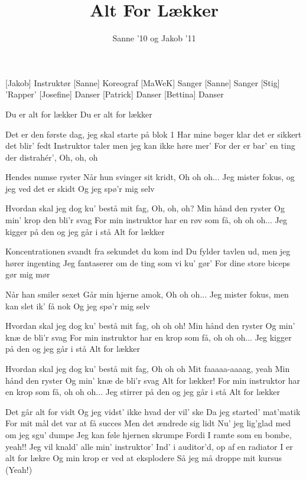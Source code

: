 \documentclass[a4paper,11pt]{article}
\title{Alt For Lækker}
\author{Sanne '10 og Jakob '11}
\begin{document}
\maketitle

\begin{roles}
[Jakob] Instruktør
[Sanne] Koreograf
[MaWeK] Sanger
[Sanne] Sanger 
[Stig] 'Rapper' 
[Josefine] Danser 
[Patrick] Danser 
[Bettina] Danser 
\end{roles}

\begin{song}
 Du er alt for lækker
Du er alt for lækker


 Det er den første dag, jeg skal starte på blok 1
Har mine bøger klar det er sikkert det blir' fedt
Instruktor taler men jeg kan ikke høre mer'
For der er bar' en ting der distrahér', 
 Oh, oh, oh

 Hendes numse ryster
Når hun svinger sit kridt, 
 Oh oh oh...
 Jeg mister fokus, og jeg ved det er skidt
Og jeg spø'r mig selv

 Hvordan skal jeg dog ku' bestå mit fag, Oh, oh, oh?
Min hånd den ryster
Og min' krop den bli'r svag
For min instruktor har en røv som få, oh oh
oh...
Jeg kigger på den og jeg går i stå 
 Alt for lækker

 Koncentrationen svandt fra sekundet du kom ind
Du fylder tavlen ud, men jeg hører ingenting
Jeg fantaserer om de ting som vi ku' gør'
For dine store biceps gør mig mør

 Når han smiler sexet
Går min hjerne amok, 
 Oh oh oh...
 Jeg mister fokus, men kan slet ik' få nok
Og jeg spø'r mig selv

 Hvordan skal jeg dog ku' bestå mit fag, oh oh oh!
Min hånd den ryster
Og min' knæ de bli'r svag
For min instruktor har en krop som få, oh oh
oh...
Jeg kigger på den og jeg går i stå 
Alt for lækker

 Hvordan skal jeg dog ku' bestå mit fag, Oh oh oh
 Mit faaaaa-aaaag, yeah 
 Min hånd den ryster
Og min' knæ de bli'r svag
 Alt for lækker!
 For min instruktor har en krop som få, oh oh
oh...
Jeg stirrer på den og jeg går i stå 
 Alt for lækker

 Det går alt for vidt
Og jeg vidst' ikke hvad der vil' ske
Da jeg started' mat'matik
For mit mål det var at få succes
Men det ændrede sig lidt
Nu' jeg lig'glad med om jeg sgu' dumpe
Jeg kan føle hjernen skrumpe
Fordi I ramte som en bombe, yeah!!
Jeg vil knald' alle min' instruktor'
Ind' i auditor'd, op
af en radiator
I er alt for lækre 
Og min krop er ved at eksplodere
Så jeg må droppe mit kursus
(Yeah!)


\end{song}
\end{document}
